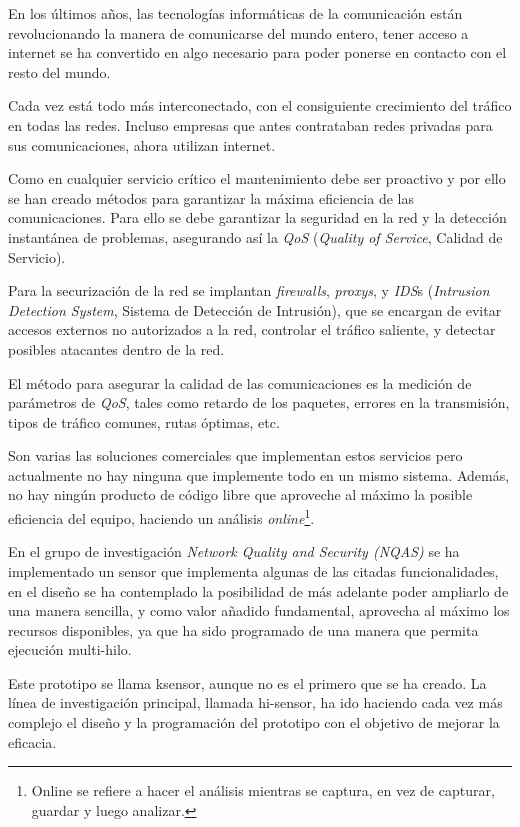 En los últimos años, las tecnologías informáticas de la comunicación están revolucionando la manera de comunicarse del mundo entero, tener acceso a internet se ha convertido en algo necesario para poder ponerse en contacto con el resto del mundo.

Cada vez está todo más interconectado, con el consiguiente crecimiento del tráfico en todas las redes. Incluso empresas que antes contrataban redes privadas para sus comunicaciones, ahora utilizan internet.

Como en cualquier servicio crítico el mantenimiento debe ser proactivo y por ello se han creado métodos para garantizar la máxima eficiencia de las comunicaciones. Para ello se debe garantizar la seguridad en la red y la detección instantánea de problemas, asegurando así la \textit{QoS} (\textit{Quality of Service}, Calidad de Servicio).

Para la securización de la red se implantan \textit{firewalls}, \textit{proxys}, y \textit{IDS}s (\textit{Intrusion Detection System}, Sistema de Detección de Intrusión), que se encargan de evitar accesos externos no autorizados a la red, controlar el tráfico saliente, y detectar posibles atacantes dentro de la red.

El método para asegurar la calidad de las comunicaciones es la medición de parámetros de \textit{QoS}, tales como retardo de los paquetes, errores en la transmisión, tipos de tráfico comunes, rutas óptimas, etc.

Son varias las soluciones comerciales que implementan estos servicios pero actualmente no hay ninguna que implemente todo en un mismo sistema. Además, no hay ningún producto de código libre que aproveche al máximo la posible eficiencia del equipo, haciendo un análisis \textit{online}\footnote{Online se refiere a hacer el análisis mientras se captura, en vez de capturar, guardar y luego analizar.}.

En el grupo de investigación \textit{Network Quality and Security (NQAS)} se ha implementado un sensor que implementa algunas de las citadas funcionalidades, en el diseño se ha contemplado la posibilidad de más adelante poder ampliarlo de una manera sencilla, y como valor añadido fundamental, aprovecha al máximo los recursos disponibles, ya que ha sido programado de una manera que permita ejecución multi-hilo.

Este prototipo se llama ksensor, aunque no es el primero que se ha creado. La línea de investigación principal, llamada hi-sensor, ha ido haciendo cada vez más complejo el diseño y la programación del prototipo con el objetivo de mejorar la eficacia.

